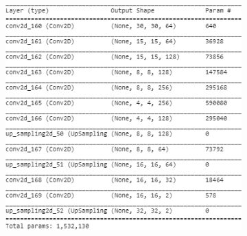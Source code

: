 \documentclass{l4proj}
\begin{document}
\begin{appendices}
\begin{figure}[h]
    \caption{Low capacity shallow model designed for a 32x32 Cifar-10 input set with accompanying loss. The network is far too simple to be a feasible colourisation model however it does serve as a good start to analyse how poorly it performs in order to see how far the structure is from being a viable model. The model is incapable of storing enough information past a certain epoch and thus the loss for both training and validation data plateaus meaning a higher capacity model is needed.}
    \label{fig:shallow_model}
    \vspace{10mm}
    \begin{subfigure}[b]{0.5\textwidth}
        \includegraphics[width=\textwidth]{images/DeepModel.PNG}
        \caption{}
    \end{subfigure}
    \quad
    \begin{subfigure}[b]{0.41\textwidth}

\end{subfigure}
\end{figure}
\end{appendices}
\end{document}
